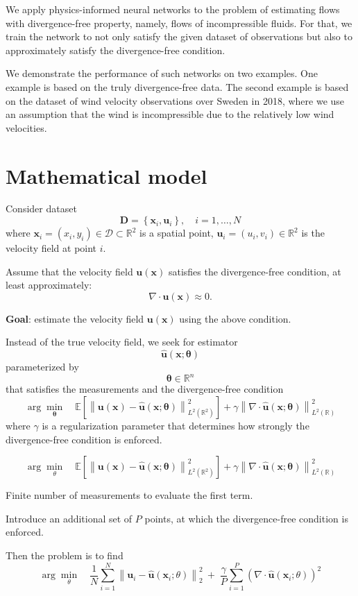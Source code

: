 \documentclass[pamm,a4paper,fleqn]{w-art}
\renewcommand{\vec}[1]{\boldsymbol{#1}}
\newcommand{\R}{\mathbb R}
\newcommand{\norm}[1]{\left\lVert#1\right\rVert}
\begin{document}
We apply physics-informed neural networks to the problem of estimating flows
with divergence-free property, namely, flows of incompressible fluids.
For that, we train the network to not only satisfy the given dataset of
observations but also to approximately satisfy the divergence-free condition.

We demonstrate the performance of such networks on two examples.
One example is based on the truly divergence-free data.
The second example is based on the dataset of wind velocity observations over
Sweden in 2018, where we use an assumption that the wind is incompressible due
to the relatively low wind velocities.

\section{Mathematical model}
Consider dataset
\[
  \vec{D} = \left\{\vec{x}_i, \vec{u}_i\right\}, \quad i = 1, \dots, N
\]
where $\vec{x}_i = (x_i, y_i) \in \mathcal D \subset \R^2$ is a spatial point,
$\vec{u}_i = (u_i, v_i) \in \R^2$ is the velocity field at point $i$.

Assume that the velocity field $\vec u (\vec x)$ satisfies the
divergence-free condition, at least approximately:
\[
  \nabla \cdot \vec u (\vec x) \approx 0.
\]

\textbf{Goal}: estimate the velocity field $\vec u  (\vec x)$ using the above
condition.

Instead of the true velocity field, we seek for estimator
\[
  \hat{\vec u} (\vec x; \vec \theta)
\]
parameterized by
\[
  \vec \theta \in \R^n
\]    
that satisfies
the measurements and the divergence-free condition
\[
  \arg \min_{\vec \theta} \quad 
  \mathbb E \left[ \norm{\vec u(\vec x) - \hat{\vec u}(\vec x; \vec{\theta})}^2_{L^2(\R^2)} \right] +
  \gamma \norm{\nabla \cdot \hat{\vec u}(\vec x; \vec{\theta})}^2_{L^2(\R)} 
\]
where $\gamma$ is a regularization parameter that determines how strongly
the divergence-free condition is enforced.

\[
  \arg \min_\theta \quad 
  \mathbb E \left[ \norm{\vec u(\vec x) - \hat{\vec u}(\vec x; \vec{\theta})}^2_{L^2(\R^2)} \right] +
  \gamma \norm{\nabla \cdot \hat{\vec u}(\vec x; \vec{\theta})}^2_{L^2(\R)} 
\]

Finite number of measurements to evaluate the first term. 

Introduce an additional set of $P$ points, at which
the divergence-free condition is enforced.

Then the problem is to find
\[
  \arg \min_\theta \quad
  \frac{1}{N} \sum_{i=1}^N \norm{\vec u_i - \hat{\vec u}(\vec x_i; \theta)}^2_2
  \ + \;
  \frac{\gamma}{P} \sum_{i=1}^P \left( \nabla \cdot \hat{\vec u}(\vec x_i; \theta)\right)^2
\]
\end{document}
